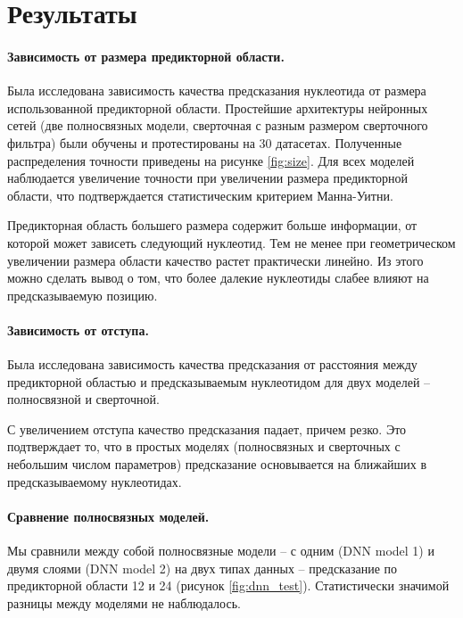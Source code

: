 \section{Результаты}
\newcommand{\mannwhitni}{{\footnotesize Значимость отличия выборок по критерию Манна-Уитни: ns $P>0.05$, * $P\leq 0.05$, ** $P\leq 0.01$, *** $P\leq 0.001$}}

\paragraph{Зависимость от размера предикторной области.} Была исследована зависимость качества предсказания нуклеотида от размера использованной предикторной области. Простейшие архитектуры нейронных сетей (две полносвязных модели, сверточная с разным размером сверточного фильтра) были обучены и протестированы на 30 датасетах. Полученные распределения точности приведены на рисунке \ref{fig:size}. Для всех моделей наблюдается увеличение точности при увеличении размера предикторной области, что подтверждается статистическим критерием Манна-Уитни.

Предикторная область большего размера содержит больше информации, от которой может зависеть следующий нуклеотид. Тем не менее при геометрическом увеличении размера области качество растет практически линейно. Из этого можно сделать вывод о том, что более далекие нуклеотиды слабее влияют на предсказываемую позицию.



\paragraph{Зависимость от отступа.} Была исследована зависимость качества предсказания от расстояния между предикторной областью и предсказываемым нуклеотидом для двух моделей -- полносвязной и сверточной. 

С увеличением отступа качество предсказания падает, причем резко. Это подтверждает то, что в простых моделях (полносвязных и сверточных с небольшим числом параметров) предсказание основывается на ближайших в предсказываемому нуклеотидах.


 
 \paragraph{Сравнение полносвязных моделей.} Мы сравнили между собой полносвязные модели -- с одним (DNN model 1) и двумя слоями (DNN model 2)  на двух типах данных -- предсказание по предикторной области 12 и 24 (рисунок \ref{fig:dnn_test}). Статистически значимой разницы между моделями не наблюдалось.
 
